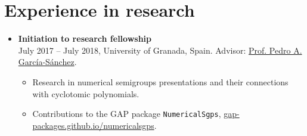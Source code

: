 \documentclass[10pt,a4paper,sans]{moderncv} %
\begin{document}

\section{Experience in research}

\begin{itemize}
\item \textbf{Initiation to research fellowship} \\
  July 2017 -- July 2018, University of Granada, Spain. Advisor: \textcolor{colorl}{\href{https://scholar.google.es/citations?user=gvq9UmMAAAAJ&hl=es&oi=ao}{Prof. Pedro A. Garc\'ia-S\'anchez}}.
\begin{itemize}
\item Research in numerical semigroups presentations and their connections with cyclotomic polynomials.
\item  Contributions to the GAP package \texttt{NumericalSgps}, \textcolor{colorl}{\url{gap-packages.github.io/numericalsgps}}.
\end{itemize}


\end{itemize}
\end{document}

